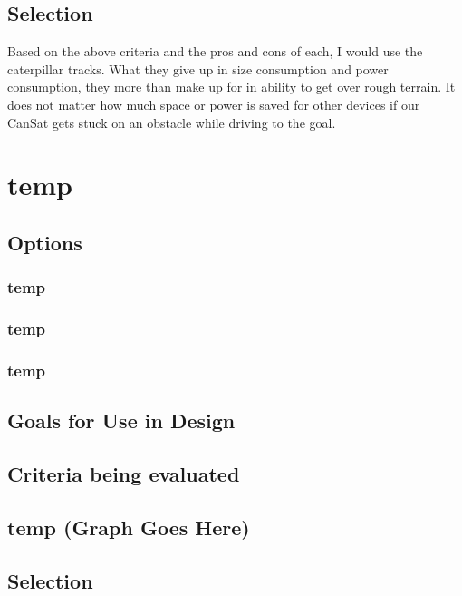 \documentclass[10pt,letterpaper,onecolumn,journal]{IEEEtran}
\begin{document}
\subsection{Selection}
Based on the above criteria and the pros and cons of each, I would use the caterpillar tracks. What they give up in size consumption and power consumption, they more than make up for in ability to get over rough terrain. It does not matter how much space or power is saved for other devices if our CanSat gets stuck on an obstacle while driving to the goal.

\section{temp}

\subsection{Options}
\subsubsection{temp}

\subsubsection{temp}

\subsubsection{temp}

\subsection{Goals for Use in Design}

\subsection{Criteria being evaluated}

\subsection*{temp (Graph Goes Here)}

\subsection{Selection}
\end{document}
